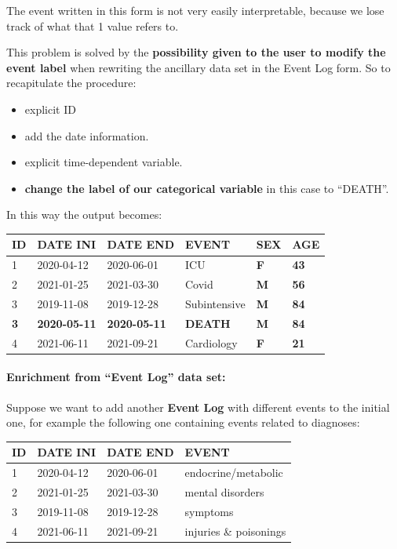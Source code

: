 \documentclass[
]{book}
\providecommand{\tightlist}{%
  \setlength{\itemsep}{0pt}\setlength{\parskip}{0pt}}
\begin{document}
The event written in this form is not very easily interpretable, because we lose track of what that 1 value refers to.

This problem is solved by the \textbf{possibility given to the user to modify the event label} when rewriting the ancillary data set in the Event Log form. So to recapitulate the procedure:

\begin{itemize}
\tightlist
\item
  explicit ID
\item
  add the date information.
\item
  explicit time-dependent variable.
\item
  \textbf{change the label of our categorical variable} in this case to ``DEATH''.
\end{itemize}

In this way the output becomes:

\begin{longtable}[]{@{}llllll@{}}
\toprule
ID & DATE INI & DATE END & EVENT & \textbf{SEX} & \textbf{AGE} \\
\midrule
\endhead
1 & 2020-04-12 & 2020-06-01 & ICU & \textbf{F} & \textbf{43} \\
2 & 2021-01-25 & 2021-03-30 & Covid & \textbf{M} & \textbf{56} \\
3 & 2019-11-08 & 2019-12-28 & Subintensive & \textbf{M} & \textbf{84} \\
\textbf{3} & \textbf{2020-05-11} & \textbf{2020-05-11} & \textbf{DEATH} & \textbf{M} & \textbf{84} \\
4 & 2021-06-11 & 2021-09-21 & Cardiology & \textbf{F} & \textbf{21} \\
\bottomrule
\end{longtable}

\hypertarget{enrichment-from-event-log-data-set}{%
\paragraph{Enrichment from ``Event Log'' data set:}\label{enrichment-from-event-log-data-set}}

Suppose we want to add another \textbf{Event Log} with different events to the initial one, for example the following one containing events related to diagnoses:

\begin{longtable}[]{@{}llll@{}}
\toprule
ID & DATE INI & DATE END & EVENT \\
\midrule
\endhead
1 & 2020-04-12 & 2020-06-01 & endocrine/metabolic \\
2 & 2021-01-25 & 2021-03-30 & mental disorders \\
3 & 2019-11-08 & 2019-12-28 & symptoms \\
4 & 2021-06-11 & 2021-09-21 & injuries \& poisonings \\
\bottomrule
\end{longtable}
\end{document}
